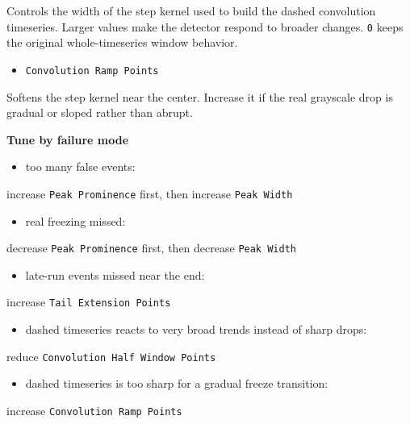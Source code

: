 \documentclass[
  9pt,
  letterpaper,
  oneside,
  open=any,
  DIV=15,
  parskip=half-,
  headings=big,
  numbers=noenddot
]{scrbook}
\newcommand{\manuallead}[1]{%
  \vspace{0.15em}%
  {\sffamily\bfseries\color{ManualBlue}#1}\par\nobreak\vspace{0.05em}%
}
\begin{document}
Controls the width of the step kernel used to build the dashed convolution timeseries. Larger values make the detector respond to broader changes. \texttt{0} keeps the original whole-timeseries window behavior.


\begin{itemize}[leftmargin=*,itemsep=0.35em,topsep=0.4em]
\item \texttt{Convolution Ramp Points}
\end{itemize}

Softens the step kernel near the center. Increase it if the real grayscale drop is gradual or sloped rather than abrupt.


\manuallead{Tune by failure mode}

\begin{itemize}[leftmargin=*,itemsep=0.35em,topsep=0.4em]
\item too many false events:
\end{itemize}

increase \texttt{Peak Prominence} first, then increase \texttt{Peak Width}


\begin{itemize}[leftmargin=*,itemsep=0.35em,topsep=0.4em]
\item real freezing missed:
\end{itemize}

decrease \texttt{Peak Prominence} first, then decrease \texttt{Peak Width}


\begin{itemize}[leftmargin=*,itemsep=0.35em,topsep=0.4em]
\item late-run events missed near the end:
\end{itemize}

increase \texttt{Tail Extension Points}


\begin{itemize}[leftmargin=*,itemsep=0.35em,topsep=0.4em]
\item dashed timeseries reacts to very broad trends instead of sharp drops:
\end{itemize}

reduce \texttt{Convolution Half Window Points}


\begin{itemize}[leftmargin=*,itemsep=0.35em,topsep=0.4em]
\item dashed timeseries is too sharp for a gradual freeze transition:
\end{itemize}

increase \texttt{Convolution Ramp Points}
\end{document}
